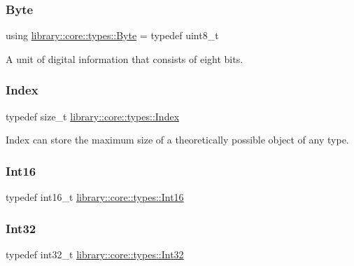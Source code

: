 \subsubsection{\texorpdfstring{Byte}{Byte}}
{\footnotesize\ttfamily using \mbox{\hyperlink{namespacelibrary_1_1core_1_1types_ae37635b89098069fb3b8c5181edd0945}{library\+::core\+::types\+::\+Byte}} = typedef uint8\+\_\+t}



A unit of digital information that consists of eight bits. 

\mbox{\label{namespacelibrary_1_1core_1_1types_ad87eeb821d7067ec94e06ed1980d6350}} 
\subsubsection{\texorpdfstring{Index}{Index}}
{\footnotesize\ttfamily typedef size\+\_\+t \mbox{\hyperlink{namespacelibrary_1_1core_1_1types_ad87eeb821d7067ec94e06ed1980d6350}{library\+::core\+::types\+::\+Index}}}



Index can store the maximum size of a theoretically possible object of any type. 

\mbox{\label{namespacelibrary_1_1core_1_1types_a150247fa2cd1b258b8e5950efcaecfc9}} 
\subsubsection{\texorpdfstring{Int16}{Int16}}
{\footnotesize\ttfamily typedef int16\+\_\+t \mbox{\hyperlink{namespacelibrary_1_1core_1_1types_a150247fa2cd1b258b8e5950efcaecfc9}{library\+::core\+::types\+::\+Int16}}}

\mbox{\label{namespacelibrary_1_1core_1_1types_acaf2598d96f2239dc55e54628da77876}} 
\subsubsection{\texorpdfstring{Int32}{Int32}}
{\footnotesize\ttfamily typedef int32\+\_\+t \mbox{\hyperlink{namespacelibrary_1_1core_1_1types_acaf2598d96f2239dc55e54628da77876}{library\+::core\+::types\+::\+Int32}}}


